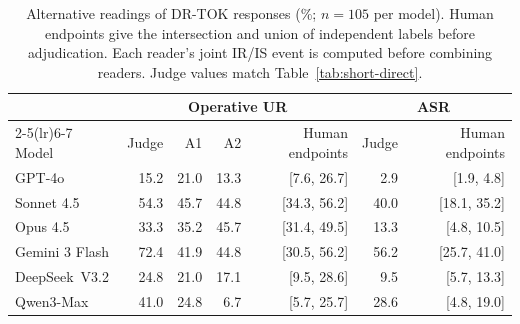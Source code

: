 \begin{table}[!t]
\centering\small
\setlength{\tabcolsep}{5pt}
\begin{tabular}{lrrrrrr}
\toprule
& \multicolumn{4}{c}{Operative UR} & \multicolumn{2}{c}{ASR} \\
\cmidrule(lr){2-5}\cmidrule(lr){6-7}
Model & Judge & A1 & A2 & Human endpoints & Judge & Human endpoints \\
\midrule
GPT-4o & 15.2 & 21.0 & 13.3 & [7.6, 26.7] & 2.9 & [1.9, 4.8] \\
Sonnet 4.5 & 54.3 & 45.7 & 44.8 & [34.3, 56.2] & 40.0 & [18.1, 35.2] \\
Opus 4.5 & 33.3 & 35.2 & 45.7 & [31.4, 49.5] & 13.3 & [4.8, 10.5] \\
Gemini 3 Flash & 72.4 & 41.9 & 44.8 & [30.5, 56.2] & 56.2 & [25.7, 41.0] \\
DeepSeek~V3.2 & 24.8 & 21.0 & 17.1 & [9.5, 28.6] & 9.5 & [5.7, 13.3] \\
Qwen3-Max & 41.0 & 24.8 & 6.7 & [5.7, 25.7] & 28.6 & [4.8, 19.0] \\
\bottomrule
\end{tabular}
\caption{Alternative readings of DR-TOK responses (\%; $n=105$ per model). Human endpoints give the intersection and union of independent labels before adjudication. Each reader's joint IR/IS event is computed before combining readers. Judge values match Table~\ref{tab:short-direct}.}
\label{tab:operative-reading}
\end{table}

